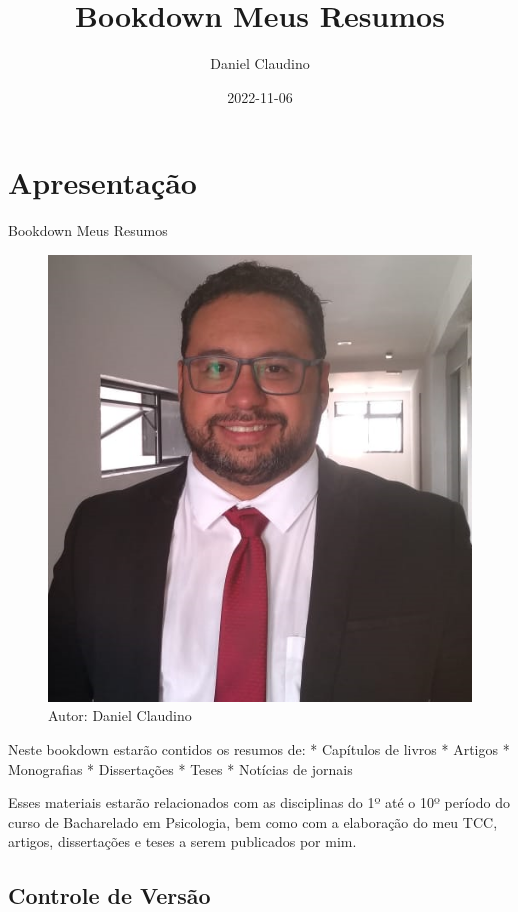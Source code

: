 \documentclass[
]{book}
\title{Bookdown Meus Resumos}
\author{Daniel Claudino}
\date{2022-11-06}
\begin{document}
\frontmatter
\maketitle

\mainmatter
\hypertarget{apresentauxe7uxe3o}{%
\chapter{Apresentação}\label{apresentauxe7uxe3o}}

Bookdown Meus Resumos

\begin{figure}

{\centering \includegraphics[width=0.5\linewidth]{imagens/FOTO-PERFIL-DANIEL-CLAUDINO-2020} 

}

\caption{Autor: Daniel Claudino}\label{fig:unnamed-chunk-1}
\end{figure}

Neste bookdown estarão contidos os resumos de: * Capítulos de livros *
Artigos * Monografias * Dissertações * Teses * Notícias de jornais

Esses materiais estarão relacionados com as disciplinas do 1º até o 10º
período do curso de Bacharelado em Psicologia, bem como com a elaboração
do meu TCC, artigos, dissertações e teses a serem publicados por mim.

\hypertarget{controle-de-versuxe3o}{%
\section{Controle de Versão}\label{controle-de-versuxe3o}}
\end{document}
